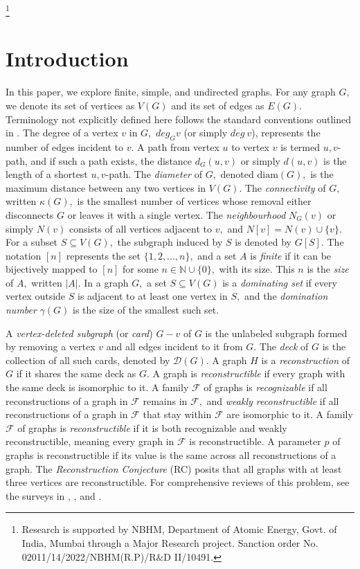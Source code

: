 \documentclass[11pt,oneside]{article}
\theoremstyle{definition}
\begin{document}
\footnote{Research is supported by  NBHM, Department of Atomic Energy, Govt. of India, Mumbai through a Major Research project. Sanction order No. 02011/14/2022/NBHM(R.P)/$\text{R\&D}$ II/10491.}

\section{Introduction}\label{intro}
In this paper, we explore finite, simple, and undirected graphs. For any graph $G,$ we denote its set of vertices as $V(G)$ and its set of edges as $E(G).$ Terminology not explicitly defined here follows the standard conventions outlined in \cite{w}. The degree of a vertex $v$ in $G,$ $deg_{G}v$ (or simply $deg~v$), represents the number of edges incident to $v.$ A path from vertex $u$ to vertex $v$ is termed $u,v$-path, and if such a path exists, the distance $d_{G}(u,v)$ or simply $d(u,v)$  is the length of a shortest $u,v$-path. The \emph{diameter} of $G,$ denoted $\mathrm{diam}(G),$ is the maximum distance between any two vertices in $V(G).$ The \emph{connectivity} of $G,$ written $\kappa(G),$ is the smallest number of vertices whose removal either disconnects $G$ or leaves it with a single vertex.  The \emph{neighbourhood} $N_{G}(v)$ or simply $N(v)$ consists of all vertices adjacent to  $v,$ and $N[v]=N(v)\cup \{v\}.$ For a subset $S\subseteq V(G),$  the subgraph induced by $S$ is denoted by $G[S].$ The notation $[n]$ represents  the set $\{1,2,...,n\},$  and a set $A$ is \emph{finite} if it can be bijectively mapped to $[n]$ for some $n \in \mathbb{N}\cup \{0\},$  with its size. This $n$ is the \emph{size} of $A,$ written $|A|.$ In a graph $G,$ a set $S \subseteq V(G)$ is a \emph{dominating set} if every vertex outside $S$ is adjacent to at least one vertex in $S,$ and the \emph{domination number} $\gamma(G)$ is the size of the smallest such set.

\indent A \emph{vertex-deleted subgraph} (or \emph{card}) $G-v$ of $G$ is the unlabeled subgraph formed  by removing  a vertex $v$ and all edges incident to it from $G$. The \emph{deck} of $G$ is the collection of all such cards, denoted by $\mathscr{D}(G).$  A graph $H$ is a \emph{reconstruction} of $G$ if it shares the same deck as $G.$ A graph is \emph{reconstructible} if every graph with the same deck  is isomorphic to it. A family $\mathcal{F}$  of graphs is \emph{recognizable} if all reconstructions of  a graph in $\mathcal{F}$ remains in $\mathcal{F},$ and \emph{weakly reconstructible} if all reconstructions of  a graph in $\mathcal{F}$ that stay within $\mathcal{F}$  are isomorphic to it. A family $\mathcal{F}$ of graphs is \emph{reconstructible} if it is both recognizable and weakly reconstructible, meaning every graph  in $\mathcal{F}$ is reconstructible. A parameter $p$ of graphs is reconstructible if its value is the same across all  reconstructions of a graph. The \emph{Reconstruction Conjecture} (RC) posits that all graphs with at least three vertices are reconstructible.  For comprehensive reviews of this problem, see the surveys in \cite{b}, \cite{bh}, \cite{h} and \cite{l}. 
\end{document}
